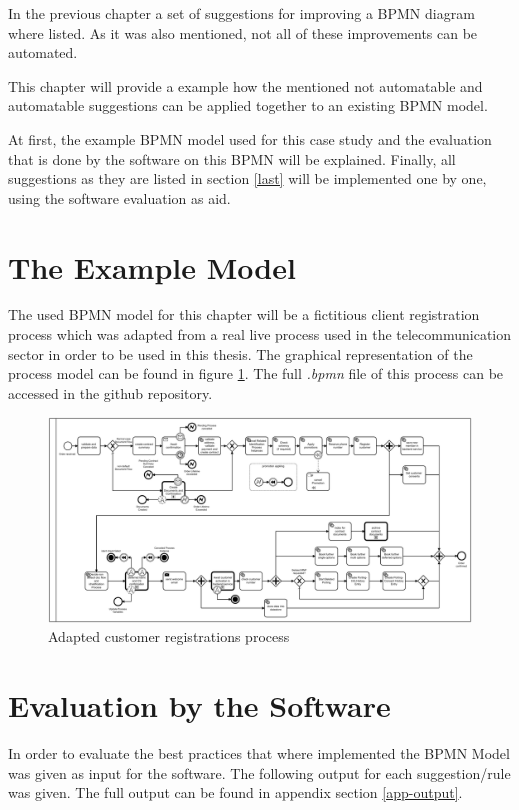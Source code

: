 \label{chapter-5}
In the previous chapter a set of suggestions for improving a BPMN diagram where listed. As it was also mentioned, not all of these improvements can be automated. 

This chapter will provide a example how the mentioned not automatable and automatable suggestions can be applied together to an existing BPMN model. 

At first, the example BPMN model used for this case study and the evaluation that is done by the software on this BPMN will be explained. Finally, all suggestions as they are listed in section \ref{last} will be implemented one by one, using the software evaluation as aid. 

\section{The Example Model}
The used BPMN model for this chapter will be a fictitious client registration process which was adapted from a real live process used in the telecommunication sector in order to be used in this thesis. The graphical representation of the process model can be found in figure \ref{fig:example-process}. The full \textit{.bpmn} file of this process can be accessed in the github repository\cite{appendix-registration-1}. 

\begin{figure}[H]
	\centering
	\includegraphics[width=1.7\columnwidth, angle=90]{graphics/register-customer/1-registercustomer-bpmn.pdf}
	\caption{Adapted customer registrations process} 
	\label{fig:example-process} 
\end{figure}

\section{Evaluation by the Software}
In order to evaluate the best practices that where implemented the BPMN Model was given as input for the software. The following output for each suggestion/rule was given. The full output can be found in appendix section \ref{app-output}.
